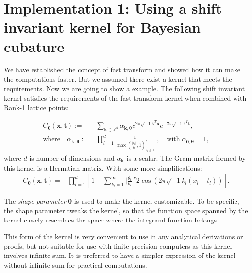 \documentclass[twocolumn]{svjour3}          %
\newcommand{\bm}[1]{\boldsymbol{#1}}
\newcommand{\vtheta}{{\bm{\theta}}}
\newcommand{\vk}{\bm{k}}
\newcommand{\vt}{\bm{t}}
\newcommand{\vx}{\bm{x}}
\begin{document}
\section{Implementation 1: Using a shift invariant kernel for Bayesian cubature}
\label{sec:shift_invariant_kernel}
We have established the concept of fast transform and showed how it can make the computations faster. But we assumed there exist a kernel that meets the requirements.
Now we are going to show a example.
The following shift invariant kernel satisfies the requirements of the fast transform kernel when combined with Rank-1 lattice points:

\begin{align}
\label{bayes_SI_kernel}
C_\vtheta(\vx, \vt) := &  \sum_{\vk \in \mathbb{Z}^d} \alpha_{\vk,\vtheta}  e^{2 \pi\sqrt{-1} \vk^T\vx}
e^{-2 \pi\sqrt{-1} \vk^T\vt},
\\
\nonumber
\text{where} \quad
\alpha_{\vk,\vtheta} := & \prod_{l=1}^d \frac{1}{\max(\frac{|k_l|}{\theta_l},1)^r_{\theta_l\leq 1}}  \;,  \quad \text{with} \; {\alpha}_{\bm{0},\vtheta} = 1,
\end{align}
where $d$ is number of dimensions and $\alpha_{\vk}$ is a scalar. The Gram matrix formed by this kernel is a Hermitian matrix. 
With some more simplifications:
\begin{align*}
C_\vtheta(\vx, \vt) = & \prod_{l=1}^d  
\left[ 1 +
\sum_{k_l=1}^\infty
\Big|\frac{\theta_l}{k_l}\Big|^r 
2 \cos({2 \pi\sqrt{-1} k_l(x_l - t_l )})
\right].
\end{align*}

The \textit{shape parameter} $\vtheta$ is used to make the kernel customizable. To be specific, the {shape parameter} tweaks the kernel, so that the function space spanned by the kernel closely resembles the space where the integrand function belongs.

This form of the kernel is very convenient to use in any analytical derivations or proofs, but not suitable for use with finite precision computers as this kernel involves infinite sum. It is preferred to have a simpler expression of the kernel without infinite sum for practical computations. 
\end{document}
